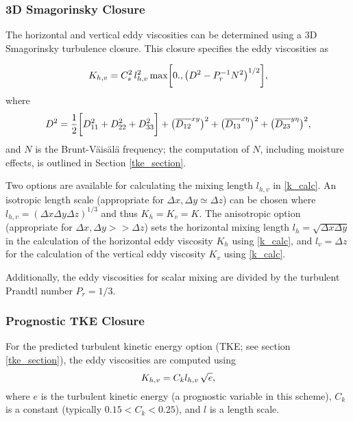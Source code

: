 \subsubsection{3D Smagorinsky Closure}

The horizontal and vertical eddy viscosities can be determined using a 
3D Smagorinsky turbulence closure.  This closure specifies the
eddy viscosities as

\begin{equation}
K_{h,v} = C_s^2 \, l_{h,v}^2 \,\hbox{max}
\biggl[ 0., \bigl( D^2 - P_r^{-1} N^2 \bigr)^{1/2}\biggr],
\label{k_calc}
\end{equation}
%
\noindent
where 
%
\begin{equation}
D^2 = 
{1 \over 2} \biggl[
D^2_{11} +
D^2_{22} +
D^2_{33} \biggr] +
\bigl({{\overline{D_{12}}}^{xy}}\bigr)^2 +
\bigl({{\overline{D_{13}}}^{x\eta}}\bigr)^2 +
\bigl({{\overline{D_{23}}}^{y\eta}}\bigr)^2,
\notag
\end{equation}
%
\noindent
and $N$ is the Brunt-V\"ais\"al\"a frequency; the computation of $N$,
including moisture effects, is outlined in Section \ref{tke_section}.

Two options are available for calculating the mixing length $l_{h,v}$ in
\eqref{k_calc}.  An isotropic length scale (appropriate for $\Delta x, \Delta y
\simeq \Delta z$) can be chosen where $l_{h,v} = (\Delta x \Delta y \Delta z)^{1/3}$
and thus $K_h = K_v = K$.  The anisotropic option (appropriate for $\Delta x, 
\Delta y >> \Delta z$) sets the horizontal mixing length $l_h = \sqrt{\Delta
x \Delta y}$ in the calculation of the horizontal eddy viscosity $K_h$
using \eqref{k_calc}, and $l_v = \Delta z$ for the calculation of the
vertical eddy viscosity $K_v$ using \eqref{k_calc}.

Additionally, the eddy viscosities
for scalar mixing are divided by the turbulent Prandtl number $P_r = 1/3$.

\subsubsection{Prognostic TKE Closure}

For the predicted turbulent kinetic energy option
(TKE; see section \ref{tke_section}), the eddy viscosities are
computed using
%
\begin{equation}
K_{h,v} = C_k l_{h,v}\, \sqrt{e},
\notag
\end{equation}
%
\noindent
where $e$ is the turbulent kinetic energy (a prognostic variable 
in this scheme), $C_k$ is a constant (typically $0.15 < C_k < 0.25$),
and $l$ is a length scale.  

